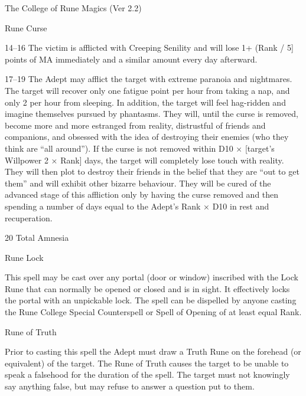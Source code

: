 \begin{Chapter}{The College of Rune Magics (Ver 2.2)}
\begin{spell}[S-6]{Rune Curse}
\begin{effects}
\begin{Description}
\item[14--16] The victim is afflicted with Creeping Senility and will
  lose 1+ (Rank / 5] points of MA immediately and a similar amount
    every day afterward.

\item[17--19] The Adept may afflict the target with extreme paranoia
  and nightmares.  The target will recover only one fatigue point per
  hour from taking a nap, and only 2 per hour from sleeping. In
  addition, the target will feel hag-ridden and imagine themselves
  pursued by phantasms. They will, until the curse is removed, become
  more and more estranged from reality, distrustful of friends and
  companions, and obsessed with the idea of destroying their enemies
  (who they think are “all around”). If the curse is not removed
  within D10 × [target’s Willpower 2 × Rank] days, the target will
  completely lose touch with reality.  They will then plot to destroy
  their friends in the belief that they are “out to get them” and will
  exhibit other bizarre behaviour.  They will be cured of the advanced
  stage of this affliction only by having the curse removed and then
  spending a number of days equal to the Adept’s Rank × D10 in rest
  and recuperation.

\item[20] Total Amnesia 
\end{Description}
\end{effects}
\end{spell}

\begin{spell}[S-7]{Rune Lock}

\begin{effects}
This spell may be cast over any portal (door or window) inscribed with
the Lock Rune that can normally be opened or closed and is in sight.
It effectively locks the portal with an unpickable lock.  The spell
can be dispelled by anyone casting the Rune College Special
Counterspell or Spell of Opening of at least equal Rank.
\end{effects}
\end{spell}

\begin{spell}[S-8]{Rune of Truth}

\begin{effects}
Prior to casting this spell the Adept must draw a Truth Rune on the
forehead (or equivalent) of the target.  The Rune of Truth causes the
target to be unable to speak a falsehood for the duration of the
spell.  The target must not knowingly say anything false, but may
refuse to answer a question put to them.


\end{effects}
\end{spell}
\end{Chapter}
